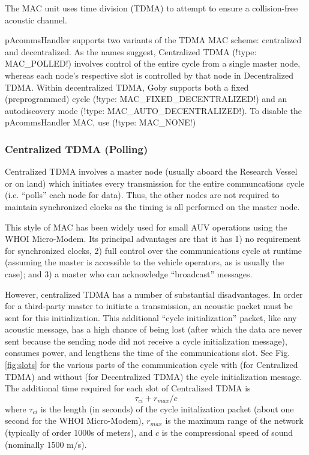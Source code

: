 The MAC unit uses time division (TDMA) to attempt to ensure a collision-free acoustic channel.

pAcommsHandler supports two variants of the TDMA MAC scheme: centralized and decentralized. As the names suggest, Centralized TDMA (!type: MAC_POLLED!) involves control of the entire cycle from a single master node, whereas each node's respective slot is controlled by that node in Decentralized TDMA. Within decentralized TDMA, Goby supports both a fixed (preprogrammed) cycle (!type: MAC_FIXED_DECENTRALIZED!) and an autodiscovery mode (!type: MAC_AUTO_DECENTRALIZED!). To disable the pAcommsHandler MAC, use (!type: MAC_NONE!)

\subsubsection{Centralized TDMA (Polling)}

Centralized TDMA involves a master node (usually aboard the Research Vessel or on land) which initiates every transmission for the entire communcations cycle (i.e. ``polls'' each node for data). Thus, the other nodes are not required to maintain synchronized clocks as the timing is all performed on the master node.

This style of MAC has been widely used for small AUV operations using the WHOI Micro-Modem. Its principal advantages are that it has 1) no requirement for synchronized clocks, 2) full control over the communications cycle at runtime (assuming the master is accessible to the vehicle operators, as is usually the case); and 3) a master who can acknowledge ``broadcast'' messages. 

However, centralized TDMA has a number of substantial disadvantages. In order for a third-party master to initiate a transmission, an acoustic packet must be sent for this initialization. This additional ``cycle initialization'' packet, like any acoustic message, has a high chance of being lost (after which the data are never sent because the sending node did not receive a cycle initialization message), consumes power, and lengthens the time of the communications slot. See Fig. \ref{fig:slots} for the various parts of the communication cycle with (for Centralized TDMA) and without (for Decentralized TDMA) the cycle initialization message. The additional time required for each slot of Centralized TDMA is
\begin{equation}\label{eq:mac_time}
\tau_{ci} + r_{max}/c
\end{equation}
where $\tau_{ci}$ is the length (in seconds) of the cycle initalization packet (about one second for the WHOI Micro-Modem), $r_{max}$ is the maximum range of the network (typically of order 1000s of meters), and $c$ is the compressional speed of sound (nominally 1500 m/s).

